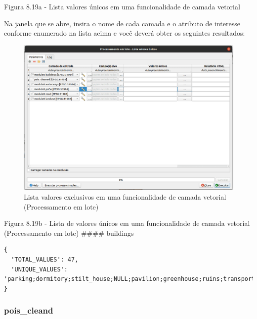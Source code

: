 \documentclass[
]{krantz}
\begin{document}
Figura 8.19a - Lista valores únicos em uma funcionalidade de camada vetorial

Na janela que se abre, insira o nome de cada camada e o atributo de interesse conforme enumerado na lista acima e você deverá obter os seguintes resultados:

\begin{figure}
\centering
\includegraphics{media/modulo8/fig819_b.png}
\caption{Lista valores exclusivos em uma funcionalidade de camada vetorial (Processamento em lote)}
\end{figure}

Figura 8.19b - Lista de valores únicos em uma funcionalidade de camada vetorial (Processamento em lote)
\#\#\#\# buildings

\begin{verbatim}
{
  'TOTAL_VALUES': 47,
  'UNIQUE_VALUES': 'parking;dormitory;stilt_house;NULL;pavilion;greenhouse;ruins;transportation;college;yes;chapel;boathouse;retail;supermarket;Prédio;college;industrial;farm;house;garages;garage;university;public;shed;roof;carport;church;temple;service;residential;hotel;warehouse;shop;cowshed;civic;kindergarten;stadium;apartments;semidetached_house;office;cabin;school;construction;commercial;terrace;grandstand;hospital;government'
}
\end{verbatim}

\hypertarget{pois_cleand}{%
\subsubsection{pois\_cleand}\label{pois_cleand}}
\end{document}
